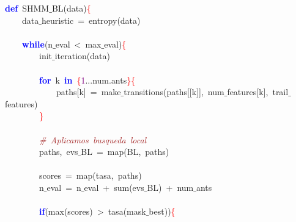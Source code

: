 \noindent
\mbox{}\textbf{\textcolor{Blue}{def}}\ SHMM$\_$BL\textcolor{BrickRed}{(}data\textcolor{BrickRed}{)}\textcolor{Red}{\{} \\
\mbox{}\ \ \ \ data$\_$heuristic\ \textcolor{BrickRed}{=}\ entropy\textcolor{BrickRed}{(}data\textcolor{BrickRed}{)} \\
\mbox{} \\
\mbox{}\ \ \ \ \textbf{\textcolor{Blue}{while}}\textcolor{BrickRed}{(}n$\_$eval\ \textcolor{BrickRed}{\textless{}}\ max$\_$eval\textcolor{BrickRed}{)}\textcolor{Red}{\{} \\
\mbox{}\ \ \ \ \ \ \ \ init$\_$iteration\textcolor{BrickRed}{(}data\textcolor{BrickRed}{)} \\
\mbox{} \\
\mbox{}\ \ \ \ \ \ \ \ \textbf{\textcolor{Blue}{for}}\ k\ \textbf{\textcolor{Blue}{in}}\ \textcolor{Red}{\{}\textcolor{Purple}{1}\textcolor{BrickRed}{...}num\textcolor{BrickRed}{.}ants\textcolor{Red}{\}\{} \\
\mbox{}\ \ \ \ \ \ \ \ \ \ \ \ paths\textcolor{BrickRed}{[}k\textcolor{BrickRed}{]}\ \textcolor{BrickRed}{=}\ make$\_$transitions\textcolor{BrickRed}{(}paths\textcolor{BrickRed}{[[}k\textcolor{BrickRed}{]],}\ num$\_$features\textcolor{BrickRed}{[}k\textcolor{BrickRed}{],}\ trail$\_$features\textcolor{BrickRed}{)} \\
\mbox{}\ \ \ \ \ \ \ \ \textcolor{Red}{\}} \\
\mbox{} \\
\mbox{}\ \ \ \ \ \ \ \ \textit{\textcolor{Brown}{\#\ Aplicamos\ busqueda\ local}} \\
\mbox{}\ \ \ \ \ \ \ \ paths\textcolor{BrickRed}{,}\ evs$\_$BL\ \textcolor{BrickRed}{=}\ map\textcolor{BrickRed}{(}BL\textcolor{BrickRed}{,}\ paths\textcolor{BrickRed}{)} \\
\mbox{} \\
\mbox{}\ \ \ \ \ \ \ \ scores\ \textcolor{BrickRed}{=}\ map\textcolor{BrickRed}{(}tasa\textcolor{BrickRed}{,}\ paths\textcolor{BrickRed}{)} \\
\mbox{}\ \ \ \ \ \ \ \ n$\_$eval\ \textcolor{BrickRed}{=}\ n$\_$eval\ \textcolor{BrickRed}{+}\ sum\textcolor{BrickRed}{(}evs$\_$BL\textcolor{BrickRed}{)}\ \textcolor{BrickRed}{+}\ num$\_$ants \\
\mbox{} \\
\mbox{}\ \ \ \ \ \ \ \ \textbf{\textcolor{Blue}{if}}\textcolor{BrickRed}{(}max\textcolor{BrickRed}{(}scores\textcolor{BrickRed}{)}\ \textcolor{BrickRed}{\textgreater{}}\ tasa\textcolor{BrickRed}{(}mask$\_$best\textcolor{BrickRed}{))}\textcolor{Red}{\{} \\
